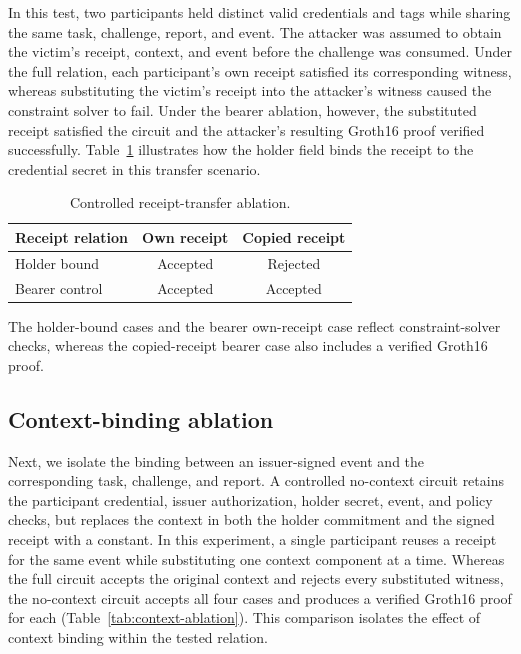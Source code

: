 \documentclass[pdflatex,iicol,sn-mathphys-num]{sn-jnl}
\begin{document}
In this test, two participants held distinct valid credentials and tags while sharing the same task, challenge, report, and event. The attacker was assumed to obtain the victim's receipt, context, and event before the challenge was consumed. Under the full relation, each participant's own receipt satisfied its corresponding witness, whereas substituting the victim's receipt into the attacker's witness caused the constraint solver to fail. Under the bearer ablation, however, the substituted receipt satisfied the circuit and the attacker's resulting Groth16 proof verified successfully. Table~\ref{tab:ablation} illustrates how the holder field binds the receipt to the credential secret in this transfer scenario.

\begin{table}[t]
\centering\caption{Controlled receipt-transfer ablation.}\label{tab:ablation}
\begin{tabular}{@{}lcc@{}}\toprule
Receipt relation & Own receipt & Copied receipt \\\midrule
Holder bound & Accepted & Rejected \\
Bearer control & Accepted & Accepted \\\bottomrule
\end{tabular}\par\vspace{2pt}
\footnotesize The holder-bound cases and the bearer own-receipt case reflect constraint-solver checks, whereas the copied-receipt bearer case also includes a verified Groth16 proof.
\end{table}

\subsection{Context-binding ablation}
Next, we isolate the binding between an issuer-signed event and the corresponding task, challenge, and report. A controlled no-context circuit retains the participant credential, issuer authorization, holder secret, event, and policy checks, but replaces the context in both the holder commitment and the signed receipt with a constant. In this experiment, a single participant reuses a receipt for the same event while substituting one context component at a time. Whereas the full circuit accepts the original context and rejects every substituted witness, the no-context circuit accepts all four cases and produces a verified Groth16 proof for each (Table~\ref{tab:context-ablation}). This comparison isolates the effect of context binding within the tested relation.
\end{document}
